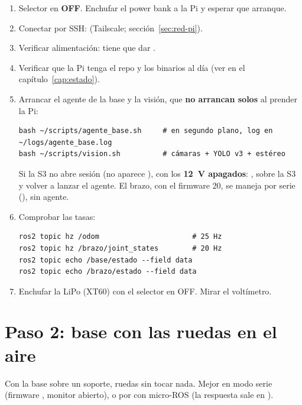 \begin{enumerate}
  \item Selector en \textbf{OFF}. Enchufar el power bank a la Pi y esperar que arranque.
  \item Conectar por SSH:  (Tailscale; sección~\ref{sec:red-pi}).
  \item Verificar alimentación:  tiene que dar .
  \item Verificar que la Pi tenga el repo y los binarios al día (ver  en el capítulo~\ref{cap:estado}).
  \item Arrancar el agente de la base y la visión, que \textbf{no arrancan solos} al prender la Pi:
\begin{lstlisting}[language=consola]
bash ~/scripts/agente_base.sh     # en segundo plano, log en ~/logs/agente_base.log
bash ~/scripts/vision.sh          # cámaras + YOLO v3 + estéreo
\end{lstlisting}
        Si la S3 no abre sesión (no aparece ), con los \textbf{12~V apagados}: ,  sobre la S3 y volver a lanzar el agente. El
        brazo, con el firmware 20, se maneja por serie (), sin agente.
  \item Comprobar las tasas:
\begin{lstlisting}[language=consola]
ros2 topic hz /odom                      # 25 Hz
ros2 topic hz /brazo/joint_states        # 20 Hz
ros2 topic echo /base/estado --field data
ros2 topic echo /brazo/estado --field data
\end{lstlisting}
  \item Enchufar la LiPo (XT60) con el selector en OFF. Mirar el voltímetro.
\end{enumerate}

\section{Paso 2: base con las ruedas en el aire}

Con la base sobre un soporte, ruedas sin tocar nada. Mejor en modo serie (firmware , monitor abierto),
o por  con micro-ROS (la respuesta sale en ).

